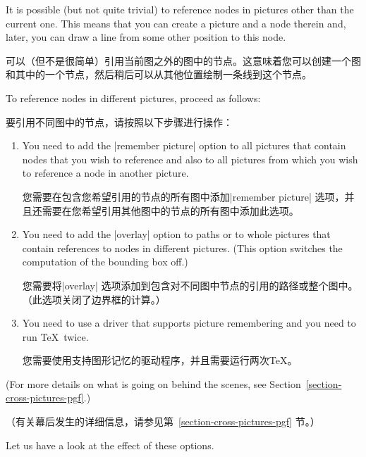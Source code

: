 It is possible (but not quite trivial) to reference nodes in pictures other
than the current one. This means that you can create a picture and a node
therein and, later, you can draw a line from some other position to this node.

可以（但不是很简单）引用当前图之外的图中的节点。这意味着您可以创建一个图和其中的一个节点，然后稍后可以从其他位置绘制一条线到这个节点。

To reference nodes in different pictures, proceed as follows:

要引用不同图中的节点，请按照以下步骤进行操作：

%
\begin{enumerate}
    \item You need to add the |remember picture| option to all pictures that
        contain nodes that you wish to reference and also to all pictures from
        which you wish to reference a node in another picture.

        您需要在包含您希望引用的节点的所有图中添加|remember picture| 选项，并且还需要在您希望引用其他图中的节点的所有图中添加此选项。


    \item You need to add the |overlay| option to paths or to whole pictures
        that contain references to nodes in different pictures. (This option
        switches the computation of the bounding box off.)

        您需要将|overlay| 选项添加到包含对不同图中节点的引用的路径或整个图中。（此选项关闭了边界框的计算。）


    \item You need to use a driver that supports picture remembering and you
        need to run \TeX\ twice.

        您需要使用支持图形记忆的驱动程序，并且需要运行两次\TeX。


\end{enumerate}
%
(For more details on what is going on behind the scenes, see
Section~\ref{section-cross-pictures-pgf}.)

（有关幕后发生的详细信息，请参见第~\ref{section-cross-pictures-pgf} 节。）


Let us have a look at the effect of these options.

